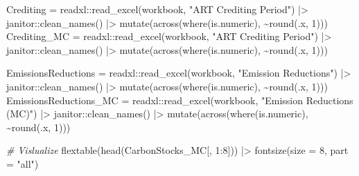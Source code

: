 \documentclass[
]{article}
\newenvironment{Shaded}{}{}
\newcommand{\AttributeTok}[1]{\textcolor[rgb]{0.49,0.56,0.16}{#1}}
\newcommand{\CommentTok}[1]{\textcolor[rgb]{0.38,0.63,0.69}{\textit{#1}}}
\newcommand{\DecValTok}[1]{\textcolor[rgb]{0.25,0.63,0.44}{#1}}
\newcommand{\FunctionTok}[1]{\textcolor[rgb]{0.02,0.16,0.49}{#1}}
\newcommand{\NormalTok}[1]{#1}
\newcommand{\OtherTok}[1]{\textcolor[rgb]{0.00,0.44,0.13}{#1}}
\newcommand{\SpecialCharTok}[1]{\textcolor[rgb]{0.25,0.44,0.63}{#1}}
\newcommand{\StringTok}[1]{\textcolor[rgb]{0.25,0.44,0.63}{#1}}
\begin{document}
\begin{Shaded}
\begin{Highlighting}[numbers=left,,]
\NormalTok{Crediting }\OtherTok{=}\NormalTok{ readxl}\SpecialCharTok{::}\FunctionTok{read\_excel}\NormalTok{(workbook, }\StringTok{"ART Crediting Period"}\NormalTok{) }\SpecialCharTok{|\textgreater{}}
\NormalTok{    janitor}\SpecialCharTok{::}\FunctionTok{clean\_names}\NormalTok{() }\SpecialCharTok{|\textgreater{}}
    \FunctionTok{mutate}\NormalTok{(}\FunctionTok{across}\NormalTok{(}\FunctionTok{where}\NormalTok{(is.numeric), }\SpecialCharTok{\textasciitilde{}}\FunctionTok{round}\NormalTok{(.x, }\DecValTok{1}\NormalTok{)))}
\NormalTok{Crediting\_MC }\OtherTok{=}\NormalTok{ readxl}\SpecialCharTok{::}\FunctionTok{read\_excel}\NormalTok{(workbook, }\StringTok{"ART Crediting Period"}\NormalTok{) }\SpecialCharTok{|\textgreater{}}
\NormalTok{    janitor}\SpecialCharTok{::}\FunctionTok{clean\_names}\NormalTok{() }\SpecialCharTok{|\textgreater{}}
    \FunctionTok{mutate}\NormalTok{(}\FunctionTok{across}\NormalTok{(}\FunctionTok{where}\NormalTok{(is.numeric), }\SpecialCharTok{\textasciitilde{}}\FunctionTok{round}\NormalTok{(.x, }\DecValTok{1}\NormalTok{)))}

\NormalTok{EmissionsReductions }\OtherTok{=}\NormalTok{ readxl}\SpecialCharTok{::}\FunctionTok{read\_excel}\NormalTok{(workbook, }\StringTok{"Emission Reductions"}\NormalTok{) }\SpecialCharTok{|\textgreater{}}
\NormalTok{    janitor}\SpecialCharTok{::}\FunctionTok{clean\_names}\NormalTok{() }\SpecialCharTok{|\textgreater{}}
    \FunctionTok{mutate}\NormalTok{(}\FunctionTok{across}\NormalTok{(}\FunctionTok{where}\NormalTok{(is.numeric), }\SpecialCharTok{\textasciitilde{}}\FunctionTok{round}\NormalTok{(.x, }\DecValTok{1}\NormalTok{)))}
\NormalTok{EmissionsReductions\_MC }\OtherTok{=}\NormalTok{ readxl}\SpecialCharTok{::}\FunctionTok{read\_excel}\NormalTok{(workbook, }\StringTok{"Emission Reductions (MC)"}\NormalTok{) }\SpecialCharTok{|\textgreater{}}
\NormalTok{    janitor}\SpecialCharTok{::}\FunctionTok{clean\_names}\NormalTok{() }\SpecialCharTok{|\textgreater{}}
    \FunctionTok{mutate}\NormalTok{(}\FunctionTok{across}\NormalTok{(}\FunctionTok{where}\NormalTok{(is.numeric), }\SpecialCharTok{\textasciitilde{}}\FunctionTok{round}\NormalTok{(.x, }\DecValTok{1}\NormalTok{)))}

\CommentTok{\# Vislualize}
\FunctionTok{flextable}\NormalTok{(}\FunctionTok{head}\NormalTok{(CarbonStocks\_MC[, }\DecValTok{1}\SpecialCharTok{:}\DecValTok{8}\NormalTok{])) }\SpecialCharTok{|\textgreater{}}
    \FunctionTok{fontsize}\NormalTok{(}\AttributeTok{size =} \DecValTok{8}\NormalTok{, }\AttributeTok{part =} \StringTok{"all"}\NormalTok{)}
\end{Highlighting}
\end{Shaded}
\end{document}
